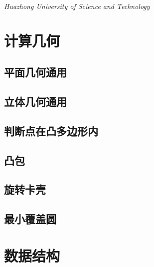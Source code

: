 \documentclass[UTF8]{ctexart}
\begin{document}
\begin{titlepage}
	\vspace{0.5\baselineskip} %
	
	\textit{Huazhong University of Science and Technology} %
	
	\vfill %
	
	
\date{\today}
	

\end{titlepage}
\setcounter{secnumdepth}{0}

\tableofcontents
\newpage
\section{计算几何}
\subsection{平面几何通用}

\subsection{立体几何通用}

\subsection{判断点在凸多边形内}

\subsection{凸包}

\subsection{旋转卡壳}

\subsection{最小覆盖圆}

\section{数据结构}
\end{document}
